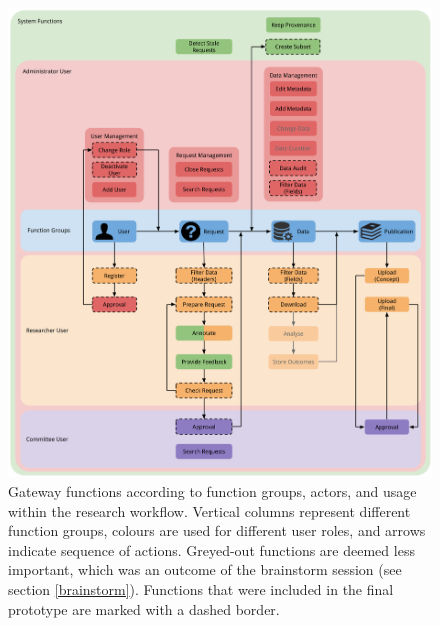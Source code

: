 \begin{figure}[!htb]
	\centering
	\includegraphics[width=1.0\linewidth]{images/functions-in-workflow}
	\caption{
		Gateway functions according to function groups, actors, and usage within the research workflow.
		Vertical columns represent different function groups, colours are used for different user roles, and arrows indicate sequence of actions.
		Greyed-out functions are deemed less important, which was an outcome of the brainstorm session (see section \ref{brainstorm}).
		Functions that were included in the final prototype are marked with a dashed border.
	}
	\label{fig:functions-workflow}
\end{figure}


